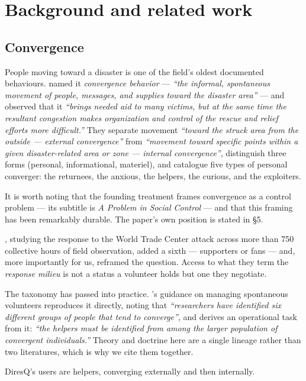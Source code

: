 \section{Background and related work}

\subsection{Convergence}

People moving toward a disaster is one of the field's oldest documented
behaviours. \citet{fritz1957} named it \emph{convergence
behavior} --- \emph{``the informal, spontaneous movement of people,
messages, and supplies toward the disaster area''} --- and observed that
it \emph{``brings needed aid to many victims, but at the same time the
resultant congestion makes organization and control of the rescue and
relief efforts more difficult.''} They separate movement \emph{``toward
the struck area from the outside --- external convergence''} from
\emph{``movement toward specific points within a given disaster-related
area or zone --- internal convergence''}, distinguish three forms
(personal, informational, materiel), and catalogue five types of
personal converger: the returnees, the anxious, the helpers, the
curious, and the exploiters.

It is worth noting that the founding treatment frames convergence as a
control problem --- its subtitle is \emph{A Problem in Social Control}
--- and that this framing has been remarkably durable. The paper's own
position is stated in §5.

\citet{kendra2002}, studying the response to the World Trade
Center attack across more than 750 collective hours of field
observation, added a sixth --- supporters or fans --- and, more
importantly for us, reframed the question. Access to what they term the
\emph{response milieu} is not a status a volunteer holds but one they
negotiate.

The taxonomy has passed into practice. \citeauthor{fema_msv}'s guidance \citeyearpar{fema_msv} on managing
spontaneous volunteers reproduces it directly, noting that
\emph{``researchers have identified six different groups of people that
tend to converge''}, and derives an operational task from it:
\emph{``the helpers must be identified from among the larger population
of convergent individuals.''} Theory and doctrine here are a single
lineage rather than two literatures, which is why we cite them together.

DiresQ's users are helpers, converging externally and then internally.

